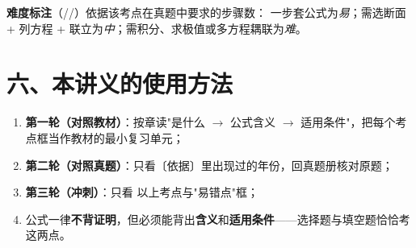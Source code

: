 \noindent\textbf{难度标注}（//）依据该考点在真题中要求的步骤数：
一步套公式为\emph{易}；需选断面 + 列方程 + 联立为\emph{中}；需积分、求极值或多方程耦联为\emph{难}。

\section*{六、本讲义的使用方法}

\begin{enumerate}
  \item \textbf{第一轮（对照教材）}：按章读"是什么 $\to$ 公式含义 $\to$ 适用条件"，把每个考点框当作教材的最小复习单元；
  \item \textbf{第二轮（对照真题）}：只看〔依据〕里出现过的年份，回真题册核对原题；
  \item \textbf{第三轮（冲刺）}：只看  以上考点与"易错点"框；
  \item 公式一律\textbf{不背证明}，但必须能背出\textbf{含义}和\textbf{适用条件}——选择题与填空题恰恰考这两点。
\end{enumerate}
